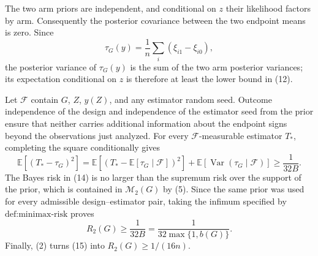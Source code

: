 The two arm priors are independent, and conditional on \(z\) their likelihood factors by arm.  Consequently the posterior covariance between the two endpoint means is zero.  Since
\[
\tau_G(y)=\frac1n\sum_i(\xi_{i1}-\xi_{i0}), \tag{13}
\]
the posterior variance of \(\tau_G(y)\) is the sum of the two arm posterior variances; its expectation conditional on \(z\) is therefore at least the lower bound in (12).

Let \(\mathcal F\) contain \(G\), \(Z\), \(y(Z)\), and any estimator random seed.  Outcome independence of the design and independence of the estimator seed from the prior ensure that neither carries additional information about the endpoint signs beyond the observations just analyzed.  For every \(\mathcal F\)-measurable estimator \(T_*\), completing the square conditionally gives
\[
\mathbb E[(T_*-\tau_G)^2]
=\mathbb E[(T_*-\mathbb E[\tau_G\mid\mathcal F])^2]
+\mathbb E[\operatorname{Var}(\tau_G\mid\mathcal F)]
\ge\frac1{32B}. \tag{14}
\]
The Bayes risk in (14) is no larger than the supremum risk over the support of the prior, which is contained in \(\mathcal M_2(G)\) by (5).  Since the same prior was used for every admissible design--estimator pair, taking the infimum specified by \(\text{def:minimax-risk}\) proves
\[
R_2(G)\ge\frac1{32B}
=\frac1{32\max\{1,b(G)\}}. \tag{15}
\]
Finally, (2) turns (15) into \(R_2(G)\ge1/(16n)\).

